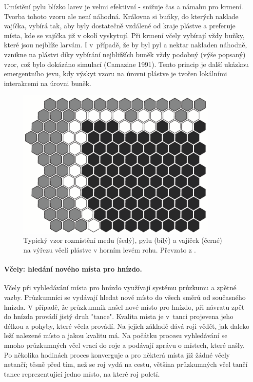 \documentclass[a4paper,12pt]{article}
\begin{document}
Umístění pylu blízko larev je velmi efektivní - snižuje čas a námahu pro krmení. Tvorba
tohoto vzoru ale není náhodná. Královna si buňky, do kterých naklade vajíčka, vybírá tak, aby
byly dostatečně vzdálené od kraje plástve a preferuje místa, kde se vajíčka již v okolí vyskytují.
Při krmení včely vybírají vždy buňky, které jsou nejblíže larvám. I v~případě, že by byl pyl
a nektar nakladen náhodně, vznikne na plástvi díky vybírání nejbližších buněk vždy podobný
(výše popsaný) vzor, což bylo dokázáno simulací (Camazine 1991). Tento princip je další ukázkou
emergentního jevu, kdy výskyt vzoru na úrovni plástve je tvořen lokálními interakcemi na úrovni
buněk.

\begin{figure}[here]
  \centering
  \includegraphics[width=10cm]{./img/comb.png}
  \caption{Typický vzor rozmístění medu (šedý), pylu (bílý) a vajíček (černé) na výřezu
   včelí plástve v horním levém rohu. Převzato z \cite{Beekman08SwarmBio}.}
  \label{fig-honeycomb}
\end{figure}


\paragraph{Včely: hledání nového místa pro hnízdo.}
Včely při vyhledávání místa pro hnízdo využívají systému průzkumu a zpětné vazby. Průzkumníci
se vydávají hledat nové místo do všech směrů od současného hnízda. V případě, že průzkumník
našel nové místo pro hnízdo, při návratu zpět do hnízda provádí jistý druh "tance". Kvalita
místa je v~tanci projevena jeho délkou a pohyby, které včela provádí. Na jejich základě dává
roji vědět, jak daleko leží nalezené místo a jakou kvalitu má. Na počátku procesu vyhledávání
se mnoho průzkumných včel vrací do roje a podávají zprávu o místech, které našly. Po několika
hodinách proces konverguje a pro některá místa již žádné včely netančí; těsně před tím, než se
roj vydá na cestu, většina průzkumných včel tančí tanec reprezentující jedno místo, na které
roj poletí.
\end{document}
